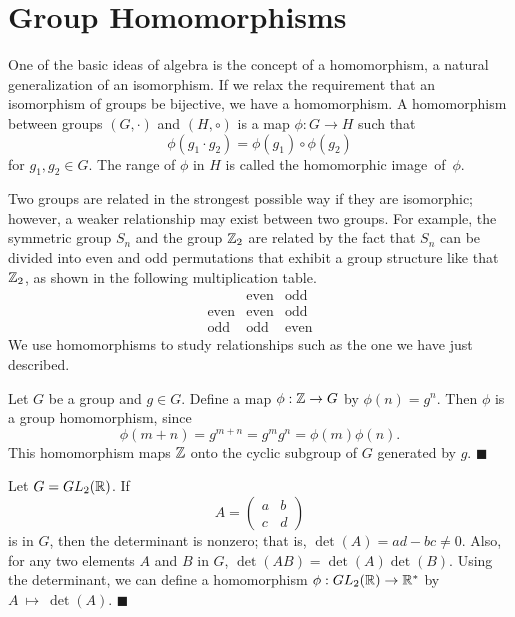  
\section{Group Homomorphisms}
 
 
One of the basic ideas of algebra is the concept of a homomorphism, a
natural generalization of an isomorphism. If we relax the requirement
that an isomorphism of groups be bijective, we have a homomorphism.  A
{\bfi homomorphism\/} between groups $(G, \cdot)$ and $(H, \circ)$ is a map $\phi :
G \rightarrow H$ such that  
$$
\phi( g_1 \cdot g_2 ) = \phi( g_1 ) \circ \phi( g_2 )
$$
for $g_1, g_2 \in G$. The range of $\phi$ in $H$ is called the {\bfi
homomorphic image\/}~of~$\phi$.
 
 
Two groups are related in the strongest possible way if they are
isomorphic; however, a weaker relationship may exist between two
groups.  For example, the symmetric group $S_n$ and the group ${\Bbb
Z}_2$ are related by the fact that $S_n$ can be divided into even and
odd permutations that exhibit a group structure like that ${\Bbb
Z}_2$, as shown in the following multiplication table. 
$$
\begin{array}{c|cc}
            & \mbox{even} & \mbox{odd} \\
\hline
\mbox{even} & \mbox{even} & \mbox{odd} \\
\mbox{odd}  & \mbox{odd}  & \mbox{even}
\end{array}
$$
We use homomorphisms to study relationships such as the one we have
just described.
 
 
\medskip
 
 
Let $G$ be a group and $g \in G$. Define a map $\phi : {\Bbb Z}
\rightarrow G$ by $\phi( n ) = g^n$. Then $\phi$ is a group
homomorphism, since 
$$
\phi( m + n ) = g^{ m + n} = g^m g^n = \phi( m ) \phi( n ).
$$
This homomorphism maps ${\Bbb Z}$ onto the cyclic subgroup of $G$
generated by $g$. 
\mbox{\hspace*{1in}}
\hspace{\fill} $\blacksquare$
 
 
\medskip
 
 
Let $G = GL_2( {\Bbb R })$. If
$$
A=
\left(
\begin{array}{cc}
a & b \\
c & d
\end{array}
\right)
$$
is in $G$, then the determinant is  nonzero; that is, $\det(A) = ad -bc
\neq 0$.  Also, for any two elements $A$ and $B$ in $G$, $\det(AB) =
\det(A) \det(B)$. Using the determinant, we can define a homomorphism
$\phi : GL_2( {\Bbb R }) \rightarrow {\Bbb R}^\ast$ by
$A~\mapsto~\det(A)$.  
\mbox{\vspace{1in}}
\hspace{\fill} $\blacksquare$
 
